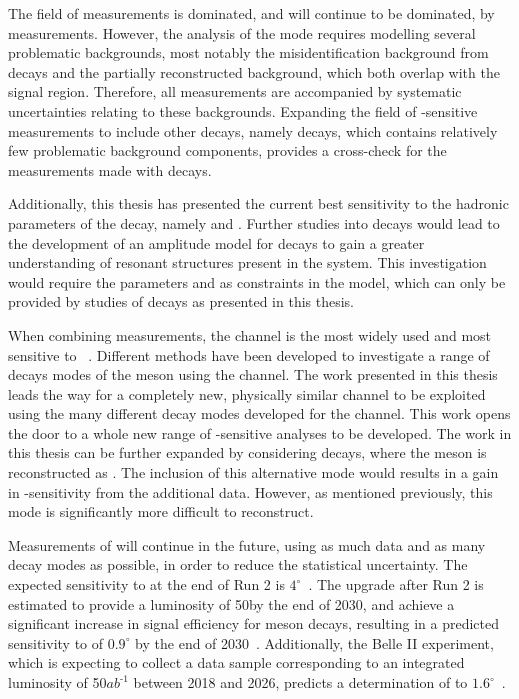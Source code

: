 The field of \Pgamma measurements is dominated, and will continue to be dominated, by \decay{\Bm}{\D\Km} measurements. However, the analysis of the \decay{\Bm}{\D\Km} mode requires modelling several problematic backgrounds, most notably the misidentification background from \decay{\Bm}{\D\pim} decays and the partially reconstructed background, which both overlap with the signal region. Therefore, all \decay{\Bm}{\D\Km} measurements are accompanied by systematic uncertainties relating to these backgrounds. Expanding the field of \Pgamma-sensitive measurements to include other \Bm decays, namely \decay{\Bm}{\D\Kstarm} decays, which contains relatively few problematic background components, provides a cross-check for the \Pgamma measurements made with \decay{\Bm}{\D\Km} decays.

Additionally, this thesis has presented the current best sensitivity to the hadronic parameters of the \Bm decay, namely \rb and \deltab. Further studies into \btodkst decays would lead to the development of an amplitude model for \decay{\Bm}{\D\KS\pim} decays to gain a greater understanding of resonant structures present in the \KS\pim system. This investigation would require the parameters \rb and \deltab as constraints in the model, which can only be provided by studies of \btodkst decays as presented in this thesis. 

When combining \Pgamma measurements, the \decay{\Bm}{\D\Km} channel is the most widely used and most sensitive to \Pgamma~\cite{LHCb-PAPER-2016-032}. Different methods have been developed to investigate a range of decays modes of the \Dz meson using the \decay{\Bm}{\D\Km} channel. The work presented in this thesis leads the way for a completely new, physically similar \decay{\Bm}{\D\Kstarm} channel to be exploited using the many different \D decay modes developed for the \decay{\Bm}{\D\Km} channel. This work opens the door to a whole new range of \Pgamma-sensitive analyses to be developed. The work in this thesis can be further expanded by considering \decay{\Bm}{\D\Kstarm} decays, where the \Kstarm meson is reconstructed as \Km\piz. The inclusion of this alternative mode would results in a gain in \Pgamma-sensitivity from the additional data. However, as mentioned previously, this mode is significantly more difficult to reconstruct.

Measurements of \Pgamma will continue in the future, using as much data and as many \Dz decay modes as possible, in order to reduce the statistical uncertainty. The expected sensitivity to \Pgamma at the end of Run 2 is $4^{\circ}$~\cite{LHCb-PAPER-2012-031}. The upgrade after Run 2 is estimated to provide a luminosity of 50\invfb by the end of 2030, and achieve a significant increase in signal efficiency for \B meson decays, resulting in a predicted sensitivity to \Pgamma of $0.9^{\circ}$ by the end of 2030~\cite{LHCb-PAPER-2012-031}. Additionally, the Belle II experiment, which is expecting to collect a data sample corresponding to an integrated luminosity of 50$ab^{\text{-1}}$ between 2018 and 2026, predicts a determination of \Pgamma to $1.6^{\circ}$~\cite{BelleII}.

\clearpage
